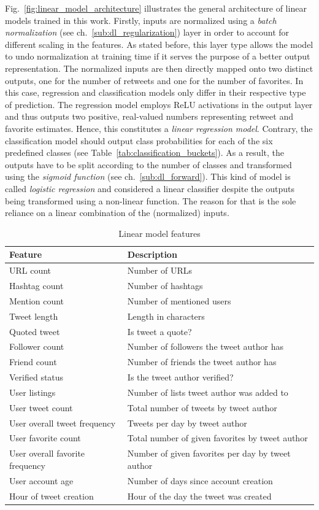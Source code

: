 Fig.~\ref{fig:linear_model_architecture} illustrates the general architecture
of linear models trained in this work.
Firstly, inputs are normalized using a \textit{batch normalization} (see ch.~\ref{sub:dl_regularization})
layer in order to account for different scaling in the features.
As stated before, this layer type allows the model to undo normalization at
training time if it serves the purpose of a better output representation.
The normalized inputs are then directly mapped onto two distinct outputs,
one for the number of retweets and one for the number of favorites.
In this case, regression and classification models only differ in their
respective type of prediction.
The regression model employs ReLU activations in the output layer and thus
outputs two positive, real-valued numbers representing retweet and favorite
estimates.
Hence, this constitutes a \textit{linear regression model}.
Contrary, the classification model should output class probabilities for each
of the six predefined classes (see Table~\ref{tab:classification_buckets}).
As a result, the outputs have to be split according to the number of classes and transformed
using the \textit{sigmoid function} (see ch.~\ref{sub:dl_forward}).
This kind of model is called \textit{logistic regression} and considered
a linear classifier despite the outputs being transformed using a non-linear
function.
The reason for that is the sole reliance on a linear combination of the
(normalized) inputs.

\begin{table}
\begin{tabular}{ll}
\toprule
Feature & Description \\
\midrule
URL count & Number of URLs \\
Hashtag count & Number of hashtags \\
Mention count & Number of mentioned users \\
Tweet length & Length in characters \\
Quoted tweet & Is tweet a quote? \\
\midrule
Follower count & Number of followers the tweet author has \\
Friend count & Number of friends the tweet author has \\
Verified status & Is the tweet author verified? \\
User listings & Number of lists tweet author was added to \\
User tweet count & Total number of tweets by tweet author \\
User overall tweet frequency & Tweets per day by tweet author \\
User favorite count & Total number of given favorites by tweet author \\
User overall favorite frequency & Number of given favorites per day by tweet author \\
User account age & Number of days since account creation \\
Hour of tweet creation & Hour of the day the tweet was created \\
\bottomrule
\end{tabular}
\caption{Linear model features}
\label{tab:structured_features}
\end{table}

